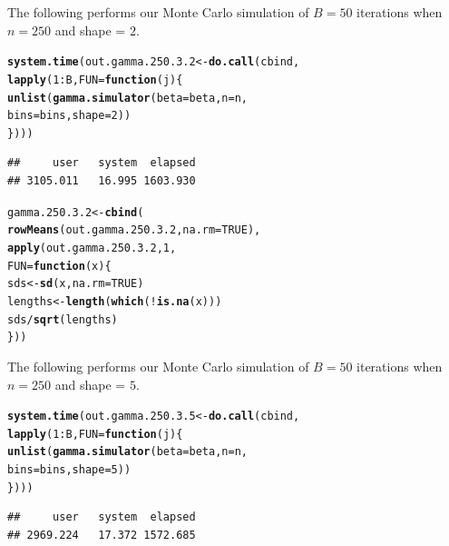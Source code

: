 \documentclass[11pt]{article}\usepackage[]{graphicx}\usepackage[]{color}
\makeatletter
\newcommand{\hlnum}[1]{\textcolor[rgb]{0.686,0.059,0.569}{#1}}%
\newcommand{\hlopt}[1]{\textcolor[rgb]{0,0,0}{#1}}%
\newcommand{\hlstd}[1]{\textcolor[rgb]{0.345,0.345,0.345}{#1}}%
\newcommand{\hlkwa}[1]{\textcolor[rgb]{0.161,0.373,0.58}{\textbf{#1}}}%
\newcommand{\hlkwb}[1]{\textcolor[rgb]{0.69,0.353,0.396}{#1}}%
\newcommand{\hlkwc}[1]{\textcolor[rgb]{0.333,0.667,0.333}{#1}}%
\newcommand{\hlkwd}[1]{\textcolor[rgb]{0.737,0.353,0.396}{\textbf{#1}}}%
\newenvironment{kframe}{%
 \def\at@end@of@kframe{}%
 \ifinner\ifhmode%
  \def\at@end@of@kframe{\end{minipage}}%
  \begin{minipage}{\columnwidth}%
 \fi\fi%
 \def\FrameCommand##1{\hskip\@totalleftmargin \hskip-\fboxsep
 \colorbox{shadecolor}{##1}\hskip-\fboxsep
     \hskip-\linewidth \hskip-\@totalleftmargin \hskip\columnwidth}%
 \MakeFramed {\advance\hsize-\width
   \@totalleftmargin\z@ \linewidth\hsize
   \@setminipage}}%
 {\par\unskip\endMakeFramed%
 \at@end@of@kframe}
\newenvironment{knitrout}{}{} %
\makeatother
\begin{document}
The following performs our Monte Carlo simulation of $B = 50$ iterations 
when $n = 250$ and shape = $2$.

\begin{knitrout}
\color{fgcolor}\begin{kframe}
\begin{alltt}
\hlkwd{system.time}\hlstd{(out.gamma.250.3.2} \hlkwb{<-} \hlkwd{do.call}\hlstd{(cbind,}
  \hlkwd{lapply}\hlstd{(}\hlnum{1}\hlopt{:}\hlstd{B,} \hlkwc{FUN} \hlstd{=} \hlkwa{function}\hlstd{(}\hlkwc{j}\hlstd{)\{}
    \hlkwd{unlist}\hlstd{(}\hlkwd{gamma.simulator}\hlstd{(}\hlkwc{beta} \hlstd{= beta,} \hlkwc{n} \hlstd{= n,}
      \hlkwc{bins} \hlstd{= bins,} \hlkwc{shape} \hlstd{=} \hlnum{2}\hlstd{))}
\hlstd{\})))}
\end{alltt}
\begin{verbatim}
##     user   system  elapsed 
## 3105.011   16.995 1603.930
\end{verbatim}
\end{kframe}
\end{knitrout}

\begin{knitrout}
\color{fgcolor}\begin{kframe}
\begin{alltt}
\hlstd{gamma.250.3.2} \hlkwb{<-} \hlkwd{cbind}\hlstd{(}
  \hlkwd{rowMeans}\hlstd{(out.gamma.250.3.2,} \hlkwc{na.rm} \hlstd{=} \hlnum{TRUE}\hlstd{),}
  \hlkwd{apply}\hlstd{(out.gamma.250.3.2,} \hlnum{1}\hlstd{,}
  \hlkwc{FUN} \hlstd{=} \hlkwa{function}\hlstd{(}\hlkwc{x}\hlstd{)\{}
    \hlstd{sds} \hlkwb{<-} \hlkwd{sd}\hlstd{(x,} \hlkwc{na.rm} \hlstd{=} \hlnum{TRUE}\hlstd{)}
    \hlstd{lengths} \hlkwb{<-} \hlkwd{length}\hlstd{(}\hlkwd{which}\hlstd{(}\hlopt{!}\hlkwd{is.na}\hlstd{(x)))}
    \hlstd{sds} \hlopt{/} \hlkwd{sqrt}\hlstd{(lengths)}
  \hlstd{\}))}
\end{alltt}
\end{kframe}
\end{knitrout}

The following performs our Monte Carlo simulation of $B = 50$ iterations 
when $n = 250$ and shape = $5$.

\begin{knitrout}
\color{fgcolor}\begin{kframe}
\begin{alltt}
\hlkwd{system.time}\hlstd{(out.gamma.250.3.5} \hlkwb{<-} \hlkwd{do.call}\hlstd{(cbind,}
  \hlkwd{lapply}\hlstd{(}\hlnum{1}\hlopt{:}\hlstd{B,} \hlkwc{FUN} \hlstd{=} \hlkwa{function}\hlstd{(}\hlkwc{j}\hlstd{)\{}
    \hlkwd{unlist}\hlstd{(}\hlkwd{gamma.simulator}\hlstd{(}\hlkwc{beta} \hlstd{= beta,} \hlkwc{n} \hlstd{= n,}
      \hlkwc{bins} \hlstd{= bins,} \hlkwc{shape} \hlstd{=} \hlnum{5}\hlstd{))}
\hlstd{\})))}
\end{alltt}
\begin{verbatim}
##     user   system  elapsed 
## 2969.224   17.372 1572.685
\end{verbatim}
\end{kframe}
\end{knitrout}
\end{document}
